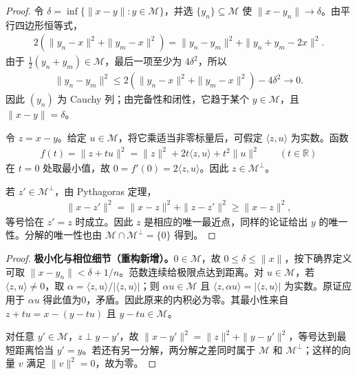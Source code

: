 \documentclass[../../main.tex]{subfiles}
\begin{document}
\begin{proof}
令 $\delta=\inf\{\|x-y\|:y\in\mathscr M\}$，并选 $\{y_n\}\subseteq\mathscr M$ 使 $\|x-y_n\|\to\delta$。由平行四边形恒等式，
\begin{align*}
2(\|y_n-x\|^2+\|y_m-x\|^2)
=\|y_n-y_m\|^2+\|y_n+y_m-2x\|^2.
\end{align*}
由于 $\tfrac12(y_n+y_m)\in\mathscr M$，最后一项至少为 $4\delta^2$，所以
\begin{align*}
\|y_n-y_m\|^2\leqslant2(\|y_n-x\|^2+\|y_m-x\|^2)-4\delta^2\longrightarrow0.
\end{align*}
因此 $(y_n)$ 为 Cauchy 列；由完备性和闭性，它趋于某个 $y\in\mathscr M$，且 $\|x-y\|=\delta$。

令 $z=x-y$。给定 $u\in\mathscr M$，将它乘适当非零标量后，可假定 $\langle z,u\rangle$ 为实数。函数
\begin{align*}
f(t)=\|z+tu\|^2=\|z\|^2+2t\langle z,u\rangle+t^2\|u\|^2\qquad(t\in\mathbb R)
\end{align*}
在 $t=0$ 处取最小值，故 $0=f'(0)=2\langle z,u\rangle$。因此 $z\in\mathscr M^\perp$。

若 $z'\in\mathscr M^\perp$，由 Pythagoras 定理，
\begin{align*}
\|x-z'\|^2=\|x-z\|^2+\|z-z'\|^2\geqslant\|x-z\|^2,
\end{align*}
等号恰在 $z'=z$ 时成立。因此 $z$ 是相应的唯一最近点，同样的论证给出 $y$ 的唯一性。分解的唯一性也由 $\mathscr M\cap\mathscr M^\perp=\{0\}$ 得到。
\end{proof}
\begin{proof}
\textbf{极小化与相位细节（重构新增）。}$0\in\mathscr M$，故 $0\leqslant\delta\leqslant\|x\|$，按下确界定义可取 $\|x-y_n\|<\delta+1/n$。范数连续给极限点达到距离。对 $u\in\mathscr M$，若 $\langle z,u\rangle\ne0$，取 $\alpha=\langle z,u\rangle/|\langle z,u\rangle|$；则 $\alpha u\in\mathscr M$ 且 $\langle z,\alpha u\rangle=|\langle z,u\rangle|$ 为实数。原证应用于 $\alpha u$ 得此值为0，矛盾。因此原来的内积必为零。其最小性来自 $z+tu=x-(y-tu)$ 且 $y-tu\in\mathscr M$。

对任意 $y'\in\mathscr M$，$z\perp y-y'$，故 $\|x-y'\|^2=\|z\|^2+\|y-y'\|^2$，等号达到最短距离恰当 $y'=y$。若还有另一分解，两分解之差同时属于 $\mathscr M$ 和 $\mathscr M^\perp$；这样的向量 $v$ 满足 $\|v\|^2=0$，故为零。
\end{proof}
\end{document}
